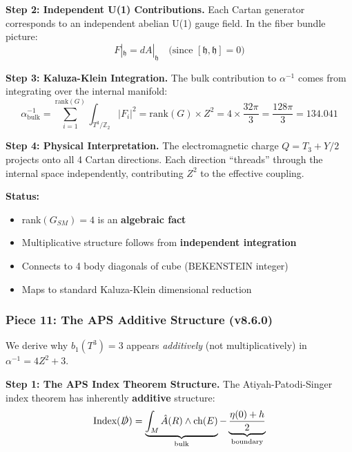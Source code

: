 \documentclass[12pt,a4paper]{article}
\newcommand{\Ztwo}{\mathbb{Z}_2}
\newcommand{\Tthree}{T^3}
\newcommand{\Zsq}{Z^2}
\begin{document}
\textbf{Step 2: Independent U(1) Contributions.}
Each Cartan generator corresponds to an independent abelian U(1) gauge field. In the fiber bundle picture:
\begin{equation}
F|_{\mathfrak{h}} = dA|_{\mathfrak{h}} \quad \text{(since } [\mathfrak{h}, \mathfrak{h}] = 0 \text{)}
\end{equation}

\textbf{Step 3: Kaluza-Klein Integration.}
The bulk contribution to $\alpha^{-1}$ comes from integrating over the internal manifold:
\begin{equation}
\alpha^{-1}_{\text{bulk}} = \sum_{i=1}^{\text{rank}(G)} \int_{\Tthree/\Ztwo} |F_i|^2 = \text{rank}(G) \times \Zsq = 4 \times \frac{32\pi}{3} = \frac{128\pi}{3} = 134.041
\end{equation}

\textbf{Step 4: Physical Interpretation.}
The electromagnetic charge $Q = T_3 + Y/2$ projects onto all 4 Cartan directions. Each direction ``threads'' through the internal space independently, contributing $\Zsq$ to the effective coupling.

\textbf{Status:}
\begin{itemize}[itemsep=0pt]
    \item[\checkmark] rank$(G_{SM}) = 4$ is an \textbf{algebraic fact}
    \item[\checkmark] Multiplicative structure follows from \textbf{independent integration}
    \item[\checkmark] Connects to 4 body diagonals of cube (BEKENSTEIN integer)
    \item[\checkmark] Maps to standard Kaluza-Klein dimensional reduction
\end{itemize}

\subsubsection{Piece 11: The APS Additive Structure (v8.6.0)}

We derive why $b_1(T^3) = 3$ appears \textit{additively} (not multiplicatively) in $\alpha^{-1} = 4\Zsq + 3$.

\textbf{Step 1: The APS Index Theorem Structure.}
The Atiyah-Patodi-Singer index theorem has inherently \textbf{additive} structure:
\begin{equation}
\text{Index}(\slashed{D}) = \underbrace{\int_M \hat{A}(R) \wedge \text{ch}(E)}_{\text{bulk}} - \underbrace{\frac{\eta(0) + h}{2}}_{\text{boundary}}
\end{equation}
\end{document}
